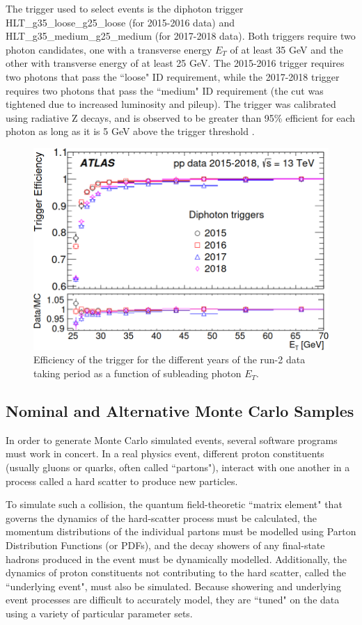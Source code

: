 The trigger used to select events is the diphoton trigger HLT\_g35\_loose\_g25\_loose (for 2015-2016 data) and HLT\_g35\_medium\_g25\_medium (for 2017-2018 data). Both triggers require two photon candidates, one with a transverse energy $E_{T}$ of at least 35 GeV and the other with transverse energy of at least 25 GeV. The 2015-2016 trigger requires two photons that pass the ``loose" ID requirement, while the 2017-2018 trigger requires two photons that pass the ``medium" ID requirement (the cut was tightened due to increased luminosity and pileup). The trigger was calibrated using radiative Z decays, and is observed to be greater than 95\% efficient for each photon as long as it is 5 GeV above the trigger threshold \cite{triggerperformance}.

\begin{figure}
\centering
\includegraphics[width=0.5\linewidth]{figures/datamc_chapter/trigger.png}
\caption{Efficiency of the trigger for the different years of the run-2 data taking period as a function of subleading photon $E_{T}$.}
\end{figure}

\subsection{Nominal and Alternative Monte Carlo Samples} \label{sec:NominalMC} 

In order to generate Monte Carlo simulated events, several software programs must work in concert. In a real physics event, different proton constituents (usually gluons or quarks, often called ``partons"), interact with one another in a process called a hard scatter to produce new particles. 

To simulate such a collision, the quantum field-theoretic ``matrix element" that governs the dynamics of the hard-scatter process must be calculated, the momentum distributions of the individual partons must be modelled using Parton Distribution Functions (or PDFs), and the decay showers of any final-state hadrons produced in the event must be dynamically modelled. Additionally, the dynamics of proton constituents not contributing to the hard scatter, called the ``underlying event", must also be simulated. Because showering and underlying event processes are difficult to accurately model, they are ``tuned" on the data using a variety of particular parameter sets. 

